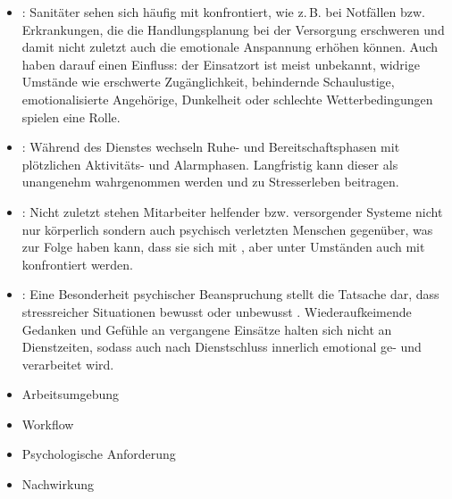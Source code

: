 {\begin{itemize}
  \item {}: Sanitäter sehen sich häufig
  mit  konfrontiert, wie
  z.\,B. bei Notfällen bzw. Erkrankungen, die die
  Handlungsplanung bei der Versorgung erschweren und damit
  nicht zuletzt auch die emotionale Anspannung erhöhen können.
  Auch  haben darauf einen
  Einfluss: der Einsatzort ist meist unbekannt, widrige
  Umstände wie erschwerte Zugänglichkeit, behindernde
  Schaulustige, emotionalisierte Angehörige, Dunkelheit oder
  schlechte Wetterbedingungen spielen eine Rolle.
  
  \item {}: Während des Dienstes wechseln
   Ruhe- und Bereitschaftsphasen mit plötzlichen Aktivitäts-
   und Alarmphasen. Langfristig kann dieser  als unangenehm wahrgenommen
  werden und zu Stresserleben beitragen.
  
  \item {}: Nicht zuletzt
  stehen Mitarbeiter helfender bzw. versorgender Systeme nicht
  nur körperlich sondern auch psychisch verletzten Menschen
  gegenüber, was zur Folge haben kann, dass sie sich mit
  , aber unter Umständen auch mit
   konfrontiert werden.
  
  \item {}: Eine Besonderheit psychischer
  Beanspruchung stellt die Tatsache dar, dass  stressreicher Situationen
  bewusst oder unbewusst . Wiederaufkeimende
  Gedanken und Gefühle an vergangene Einsätze halten sich
  nicht an Dienstzeiten, sodass auch nach Dienstschluss
  innerlich emotional ge- und verarbeitet wird.
\end{itemize}}
{\begin{itemize}
  \item {Arbeitsumgebung}
  \item {Workflow}
  \item {Psychologische Anforderung} 
  \item {Nachwirkung}
\end{itemize}}
{}
{}
{}

